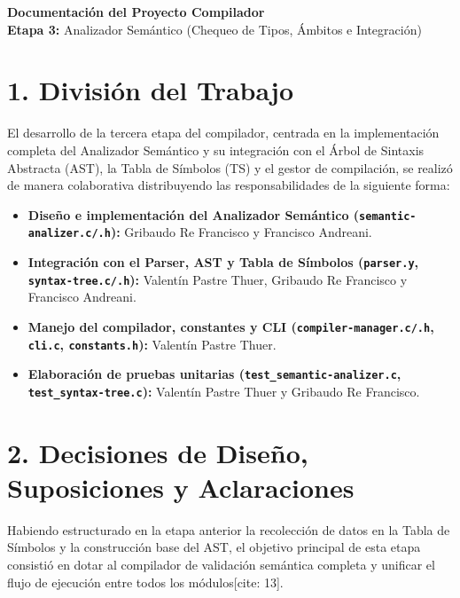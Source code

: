 \documentclass[12pt, a4paper]{article}
\begin{document}
\begin{center}
    {\LARGE \textbf{\textcolor{primary}{Documentación del Proyecto Compilador}}} \\
    \vspace{0.5cm}
    {\large \textbf{Etapa 3:} Analizador Semántico (Chequeo de Tipos, Ámbitos e Integración)}
\end{center}
\vspace{0.8cm}

\section{1. División del Trabajo}
El desarrollo de la tercera etapa del compilador, centrada en la implementación completa del Analizador Semántico y su integración con el Árbol de Sintaxis Abstracta (AST), la Tabla de Símbolos (TS) y el gestor de compilación, se realizó de manera colaborativa distribuyendo las responsabilidades de la siguiente forma:

\begin{itemize}
    \item \textbf{Diseño e implementación del Analizador Semántico (\texttt{semantic-analizer.c/.h}):} Gribaudo Re Francisco y Francisco Andreani.
    \item \textbf{Integración con el Parser, AST y Tabla de Símbolos (\texttt{parser.y}, \texttt{syntax-tree.c/.h}):} Valentín Pastre Thuer, Gribaudo Re Francisco y Francisco Andreani.
    \item \textbf{Manejo del compilador, constantes y CLI (\texttt{compiler-manager.c/.h}, \texttt{cli.c}, \texttt{constants.h}):} Valentín Pastre Thuer.
    \item \textbf{Elaboración de pruebas unitarias (\texttt{test\_semantic-analizer.c}, \texttt{test\_syntax-tree.c}):} Valentín Pastre Thuer y Gribaudo Re Francisco.
\end{itemize}

\section{2. Decisiones de Diseño, Suposiciones y Aclaraciones}
Habiendo estructurado en la etapa anterior la recolección de datos en la Tabla de Símbolos y la construcción base del AST, el objetivo principal de esta etapa consistió en dotar al compilador de validación semántica completa y unificar el flujo de ejecución entre todos los módulos[cite: 13].
\end{document}
